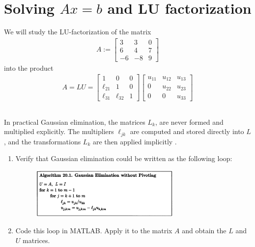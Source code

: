 \documentclass[11pt,letterpaper]{article}
\begin{document}
 

\section{Solving $Ax=b$ and LU factorization}
We will study the LU-factorization of the matrix
\begin{align*}
    A:=
  \begin{bmatrix}
    3  &   3   &    0\\
    6  &   4   &  7\\
    -6 &  -8   &   9
  \end{bmatrix}
\end{align*}
into the product
\begin{align*}
A = LU =
\begin{bmatrix}
1 & 0 & 0 \\
    \ell_{21} & 1 & 0\\
    \ell_{31} & \ell_{32} & 1
\end{bmatrix}
\begin{bmatrix}
    u_{11} & u_{12} & u_{13} \\
    0 & u_{22} & u_{23}\\
    0 & 0 & u_{33}
\end{bmatrix}
\end{align*}

\subsection{}
In practical Gaussian elimination, the matrices $L_k$, are never formed and multiplied explicitly. The multipliers $\ell_{jk}$ are computed and stored directly into $L$, and the transformations $L_k$ are then applied implicitly \parencite[p.151]{TrefethenBau_97}.

\begin{enumerate}
    \item Verify that Gaussian elimination could be written as the following loop:
    \begin{figure}[H]
        \centering
        \includegraphics[width = 0.7\textwidth]{figs/TB97_Guass_wo_piv}
    \end{figure}
    \item Code this loop in MATLAB. Apply it to the matrix $A$ and obtain the $L$ and $U$ matrices.
\end{enumerate}
\end{document}
